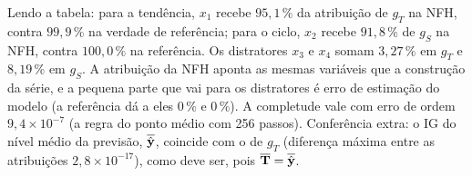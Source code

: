 \documentclass[11pt,a4paper]{article}
\begin{document}
\begin{table}[H]
\centering
\caption{IG por variável (somado sobre as linhas da janela). Participação é o valor absoluto da atribuição da variável dividido pela soma dos valores absolutos. Colunas ``verdade'': IG da função do oráculo.}\label{tab:ig}
\footnotesize
{}
\par\vspace{2pt}{\footnotesize Fonte: elaborado pelo autor.}
\end{table}

Lendo a tabela: para a tendência, $x_1$ recebe $95,1\,\%$ da atribuição de $g_T$ na NFH, contra $99,9\,\%$ na verdade de referência; para o ciclo, $x_2$ recebe $91,8\,\%$ de $g_S$ na NFH, contra $100,0\,\%$ na referência. Os distratores $x_3$ e $x_4$ somam $3,27\,\%$ em $g_T$ e $8,19\,\%$ em $g_S$. A atribuição da NFH aponta as mesmas variáveis que a construção da série, e a pequena parte que vai para os distratores é erro de estimação do modelo (a referência dá a eles $0\,\%$ e $0\,\%$). A completude vale com erro de ordem $9,4\times 10^{-7}$ (a regra do ponto médio com 256 passos). Conferência extra: o IG do nível médio da previsão, $\overline{\hat{\mathbf{y}}}$, coincide com o de $g_T$ (diferença máxima entre as atribuições $2,8\times 10^{-17}$), como deve ser, pois $\overline{\mathbf{T}}=\overline{\hat{\mathbf{y}}}$.
\end{document}
